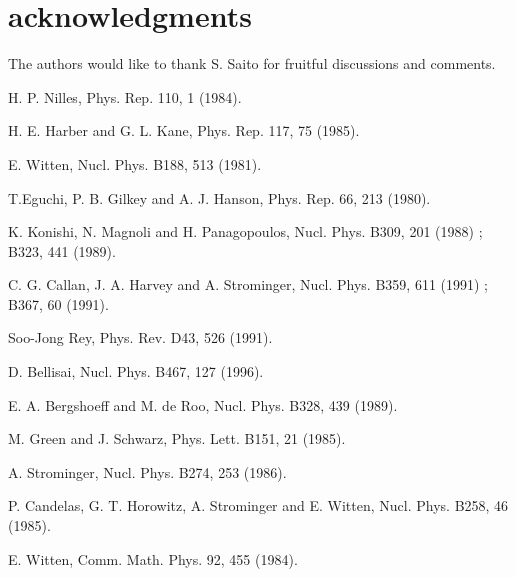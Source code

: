 \documentclass[a4paper,aps, amssymb, preprint, 12pt]{revtex4}
\begin{document}
\section{acknowledgments}
The authors would like to thank S. Saito for fruitful discussions and comments.


\begin{thebibliography}{99}
H. P. Nilles, Phys. Rep. 110, 1 (1984).

H. E. Harber and G. L. Kane, Phys. Rep. 117, 75 (1985).

E. Witten, Nucl. Phys. B188, 513 (1981).

T.Eguchi, P. B. Gilkey and A. J. Hanson, Phys. Rep. 66, 213 (1980).

K. Konishi, N. Magnoli and H. Panagopoulos, Nucl. Phys. B309, 201 (1988) ; B323, 441 (1989).

C. G. Callan, J. A. Harvey and A. Strominger, Nucl. Phys. B359, 611 (1991) ; B367, 60 (1991).

Soo-Jong Rey, Phys. Rev. D43, 526 (1991).

D. Bellisai, Nucl. Phys. B467, 127 (1996).

E. A. Bergshoeff and M. de Roo, Nucl. Phys. B328, 439 (1989).

M. Green and J. Schwarz, Phys. Lett. B151, 21 (1985).





A. Strominger, Nucl. Phys. B274, 253 (1986).

P. Candelas, G. T. Horowitz, A. Strominger and E. Witten, Nucl. Phys. B258, 46 (1985).

E. Witten, Comm. Math. Phys. 92, 455 (1984).




\end{thebibliography}
\end{document}
